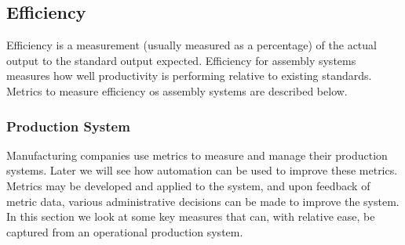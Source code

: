 \subsection{Efficiency}
Efficiency is a measurement (usually measured as a percentage) of the actual output to the standard output expected. Efficiency for assembly systems measures how well productivity is performing relative to existing standards. Metrics to measure efficiency os assembly systems are described below.

\subsubsection{Production System}
Manufacturing companies use metrics to measure and manage their production
systems. Later we will see how automation can be used to improve these
metrics. Metrics may be developed and applied to the system, and upon
feedback of metric data, various administrative decisions can be made to
improve the system. In this section we look at some key measures that can, with
relative ease, be captured from an operational production system.

